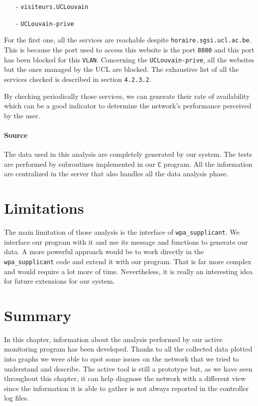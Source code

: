 \begin{itemize}
	\item [-] \texttt{visiteurs.UCLouvain}
	\item [-] \texttt{UCLouvain-prive}
\end{itemize}

For the first one, all the services are reachable despite \texttt{horaire.sgsi.ucl.ac.be}. This is because the port used to access this website is the port \texttt{8080} and this port has been blocked for this \texttt{VLAN}. Concerning the \texttt{UCLouvain-prive}, all the websites but the ones managed by the UCL are blocked. The exhaustive list of all the services checked is described in section \texttt{4.2.3.2}.

By checking periodically those services, we can generate their rate of availability which can be a good indicator to determine the network's performance perceived by the user.


\paragraph*{Source} The data used in this analysis are completely generated by our system. The tests are performed by subroutines implemented in our \texttt{C} program. All the information are centralized in the server that also handles all the data analysis phase.

\section{Limitations}


The main limitation of those analysis is the interface of \texttt{wpa\_supplicant}. We interface our program with it and use its message and functions to generate our data. A more powerful approach would be to work directly in the \texttt{wpa\_supplicant} code and extend it with our program. That is far more complex and would require a lot more of time. Nevertheless, it is really an interesting idea for future extensions for our system.

\section{Summary}
In this chapter, information about the analysis performed by our active monitoring program has been developed. Thanks to all the collected data plotted into graphs we were able to spot some issues on the network that we tried to understand and describe. The active tool is still a prototype but, as we have seen throughout this chapter, it can help diagnose the network with a different view since the information it is able to gather is not always reported in the controller log files.
